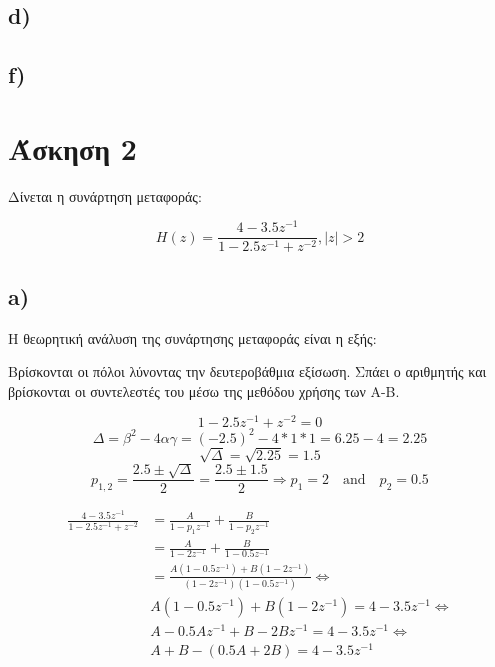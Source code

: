 \documentclass[11pt]{article}
\begin{document}
\subsection*{d)}

\subsection*{f)}


\section*{Άσκηση 2}
Δίνεται η συνάρτηση μεταφοράς:

$$H(z) = \frac{ 4 - 3.5z^{-1}}{1 - 2.5z^{-1} + z^{-2} } , |z| > 2$$

\subsection*{a)}
Η θεωρητική ανάλυση της συνάρτησης μεταφοράς είναι η εξής:
\par \noindent
Βρίσκονται οι πόλοι λύνοντας την δευτεροβάθμια εξίσωση.
Σπάει ο αριθμητής και βρίσκονται οι συντελεστές του μέσω της μεθόδου χρήσης των Α-Β.

\[ 1 - 2.5z^{-1} + z^{-2} = 0 \]
\[ Δ = β^2-4αγ = (-2.5)^2-4*1*1 = 6.25 - 4 = 2.25 \]
\[ \sqrt{Δ} = \sqrt{2.25} = 1.5 \]
\[ p_{1,2} = \frac{2.5 \pm \sqrt{Δ}}{2} = \frac{2.5\pm1.5}{2} \Rightarrow p_1=2 \quad \textrm{and} \quad p_2=0.5 \]


\begin{align*}
    \frac{4-3.5z^{-1}}{1-2.5z^{-1}+z^{-2}} &= \frac{A}{1-p_{1}z^{-1}} + \frac{B}{1-p_{2}z^{-1}} \\
    &=\frac{A}{1-2z^{-1}} + \frac{B}{1-0.5z^{-1}} \\
    &=\frac{A(1-0.5z^{-1}) + B(1-2z^{-1})}{(1-2z^{-1})(1-0.5z^{-1})} \Leftrightarrow \\
    & A(1-0.5z^{-1}) + B(1-2z^{-1})=4-3.5z^{-1} \Leftrightarrow \\
    & A - 0.5Az^{-1} + B -2Bz^{-1} = 4 -3.5z^{-1} \Leftrightarrow \\
    & A + B - (0.5A + 2B) = 4 -3.5z^{-1}
\end{align*}
\end{document}
